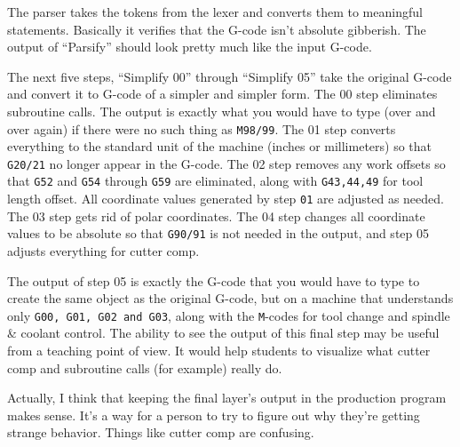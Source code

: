 \documentclass[titlepage,oneside,10pt]{article}
\begin{document}
{The parser takes the tokens from the lexer and converts them to
meaningful statements. Basically it verifies that the G-code isn't
absolute gibberish. The output of ``Parsify'' should look pretty much
like the input G-code. 

The next five steps, ``Simplify 00'' through ``Simplify 05'' take the
original G-code and convert it to G-code of a simpler and simpler
form. The 00 step eliminates subroutine calls. The output is exactly what
you would have to type (over and over again) if there were no such
thing as {\tt M98/99}. The 01 step converts everything to the standard
unit of the machine (inches or millimeters) so that {\tt G20/21} no
longer appear in the G-code. The 02 step removes any work offsets so
that {\tt G52} and {\tt G54} through {\tt G59} are eliminated, along
with {\tt G43,44,49} for tool length offset. All coordinate values
generated by step {\tt 01} are adjusted as needed. The 03 step gets
rid of polar coordinates. The 04 step changes all coordinate values to
be absolute so that {\tt G90/91} is not needed in the output, and step
05 adjusts everything for cutter comp.

The output of step 05 is exactly the G-code that you would have to
type to create the same object as the original G-code, but on a
machine that understands only {\tt G00, G01, G02 and G03}, along with
the {\tt M}-codes for tool change and spindle \& coolant control. The ability
to see the output of this final step may be useful from a teaching
point of view. It would help students to visualize what cutter comp and
subroutine calls (for example) really do.

Actually, I think that keeping the final layer's output in the
production program makes sense. It's a way for a person to try to
figure out why they're getting strange behavior. Things like cutter
comp are confusing.










}
\end{document}
